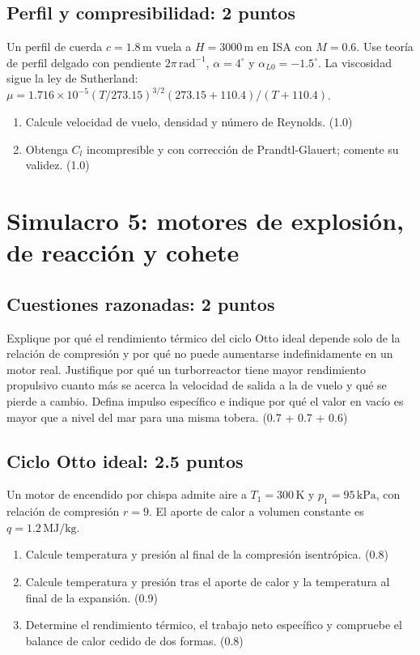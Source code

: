 \section{Perfil y compresibilidad: 2 puntos}
Un perfil de cuerda $c=1.8\,\mathrm m$ vuela a $H=3000\,\mathrm m$ en ISA con $M=0.6$. Use teoría de perfil delgado con pendiente $2\pi\,\mathrm{rad^{-1}}$, $\alpha=4^\circ$ y $\alpha_{L0}=-1.5^\circ$. La viscosidad sigue la ley de Sutherland: $\mu=1.716\times10^{-5}(T/273.15)^{3/2}(273.15+110.4)/(T+110.4)$.
\begin{enumerate}[label=\alph*)]
\item Calcule velocidad de vuelo, densidad y número de Reynolds. (1.0)
\item Obtenga $C_l$ incompresible y con corrección de Prandtl-Glauert; comente su validez. (1.0)
\end{enumerate}

\chapter{Simulacro 5: motores de explosión, de reacción y cohete}
\section{Cuestiones razonadas: 2 puntos}
Explique por qué el rendimiento térmico del ciclo Otto ideal depende solo de la relación de compresión y por qué no puede aumentarse indefinidamente en un motor real. Justifique por qué un turborreactor tiene mayor rendimiento propulsivo cuanto más se acerca la velocidad de salida a la de vuelo y qué se pierde a cambio. Defina impulso específico e indique por qué el valor en vacío es mayor que a nivel del mar para una misma tobera. (0.7 + 0.7 + 0.6)
\section{Ciclo Otto ideal: 2.5 puntos}
Un motor de encendido por chispa admite aire a $T_1=300\,\mathrm K$ y $p_1=95\,\mathrm{kPa}$, con relación de compresión $r=9$. El aporte de calor a volumen constante es $q=1.2\,\mathrm{MJ/kg}$.
\begin{enumerate}[label=\alph*)]
\item Calcule temperatura y presión al final de la compresión isentrópica. (0.8)
\item Calcule temperatura y presión tras el aporte de calor y la temperatura al final de la expansión. (0.9)
\item Determine el rendimiento térmico, el trabajo neto específico y compruebe el balance de calor cedido de dos formas. (0.8)
\end{enumerate}
